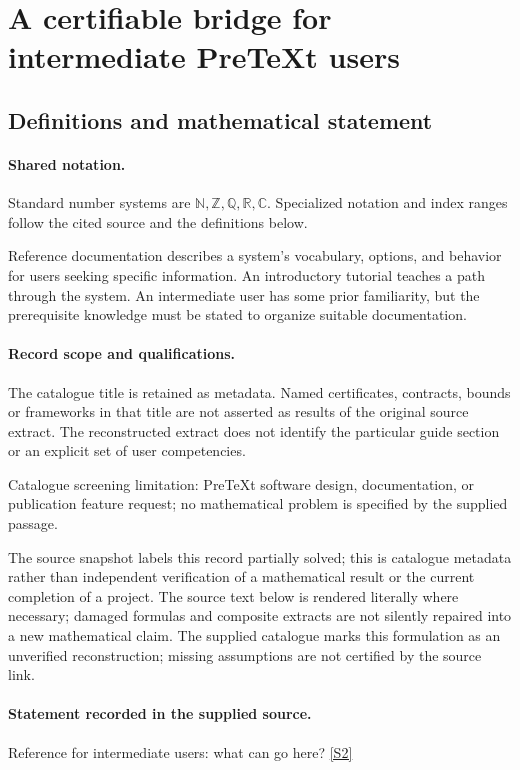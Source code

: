 \documentclass[11pt]{article}
\newcommand{\sref}[2]{\hyperlink{source:#1:#2}{[S#2]}}
\begin{document}
\section{A certifiable bridge for intermediate PreTeXt users}\label{statement}

\subsection{Definitions and mathematical statement}

\paragraph{Shared notation.}Standard number systems are $\mathbb N,\mathbb Z,\mathbb Q,\mathbb R,\mathbb C$. Specialized notation and index ranges follow the cited source and the definitions below.


Reference documentation describes a system's vocabulary, options, and behavior for users seeking specific information. An introductory tutorial teaches a path through the system. An intermediate user has some prior familiarity, but the prerequisite knowledge must be stated to organize suitable documentation.
\paragraph{Record scope and qualifications.}
The catalogue title is retained as metadata. Named certificates, contracts, bounds or frameworks in that title are not asserted as results of the original source extract.
The reconstructed extract does not identify the particular guide section or an explicit set of user competencies.

Catalogue screening limitation: PreTeXt software design, documentation, or publication feature request; no mathematical problem is specified by the supplied passage.

The source snapshot labels this record partially solved; this is catalogue metadata rather than independent verification of a mathematical result or the current completion of a project.
The source text below is rendered literally where necessary; damaged formulas and composite extracts are not silently repaired into a new mathematical claim.
The supplied catalogue marks this formulation as an unverified reconstruction; missing assumptions are not certified by the source link.
\paragraph{Statement recorded in the supplied source.}
Reference for intermediate users: what can go here? \sref{statement}{2}
\end{document}
